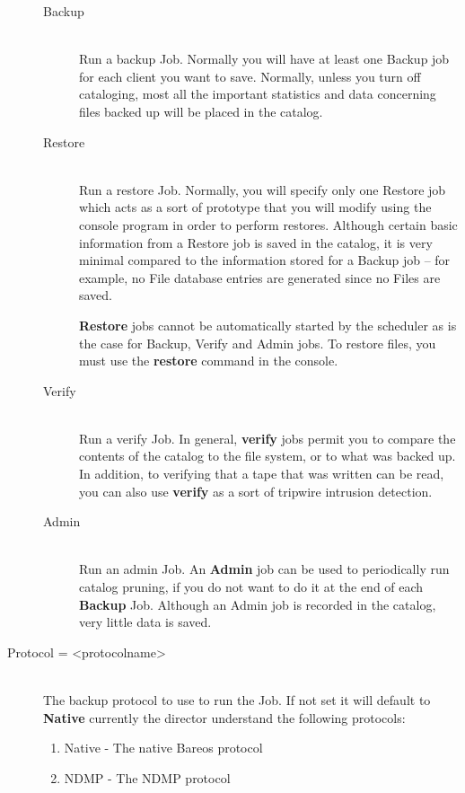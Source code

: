 \begin{description}
\begin{description}

\item [Backup] \hfill \\
Run a backup Job. Normally you will  have at least one Backup job for each
client you want  to save. Normally, unless you turn off cataloging,  most all
the important statistics and data concerning  files backed up will be placed
in the catalog.

\item [Restore] \hfill \\
Run a restore Job.  Normally, you will specify only one Restore job
which acts as a sort of prototype that you will modify using the console
program in order to perform restores.  Although certain basic
information from a Restore job is saved in the catalog, it is very
minimal compared to the information stored for a Backup job -- for
example, no File database entries are generated since no Files are
saved.

{\bf Restore} jobs cannot be
automatically started by the scheduler as is the case for Backup, Verify
and Admin jobs. To restore files, you must use the {\bf restore} command
in the console.


\item [Verify] \hfill \\
Run a verify Job. In general, {\bf verify}  jobs permit you to compare the
contents of the catalog  to the file system, or to what was backed up. In
addition,  to verifying that a tape that was written can be read,  you can
also use {\bf verify} as a sort of tripwire  intrusion detection.

\item [Admin] \hfill \\
Run an admin Job. An {\bf Admin} job can  be used to periodically run catalog
pruning, if you  do not want to do it at the end of each {\bf Backup}  Job.
Although an Admin job is recorded in the  catalog, very little data is saved.
\end{description}

\item [Protocol = {\textless}protocolname{\textgreater}] \hfill \\
The backup protocol to use to run the Job. If not set it will default
to {\bf Native} currently the director understand the following protocols:
\begin{enumerate}
\item Native - The native Bareos protocol
\item NDMP - The NDMP protocol
\end{enumerate}


\end{description}
